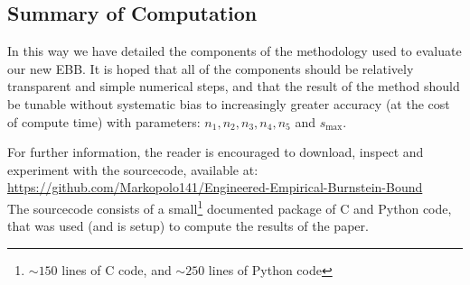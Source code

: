 \documentclass[aap,preprint]{imsart}
\begin{document}
\subsection{Summary of Computation}
In this way we have detailed the components of the methodology used to evaluate our new EBB.
It is hoped that all of the components should be relatively transparent and simple numerical steps, and that the result of the method should be tunable without systematic bias to increasingly greater accuracy (at the cost of compute time) with parameters: $n_1,n_2,n_3,n_4,n_5$ and $s_\text{max}$.

For further information, the reader is encouraged to download, inspect and experiment with the sourcecode, available at:\\\href{https://github.com/Markopolo141/Engineered-Empirical-Burnstein-Bound}{https://github.com/Markopolo141/Engineered-Empirical-Burnstein-Bound}\\
The sourcecode consists of a small\footnote{$\sim 150$ lines of C code, and $\sim 250$ lines of Python code} documented package of C and Python code, that was used (and is setup) to compute the results of the paper.

\newpage


\end{document}

